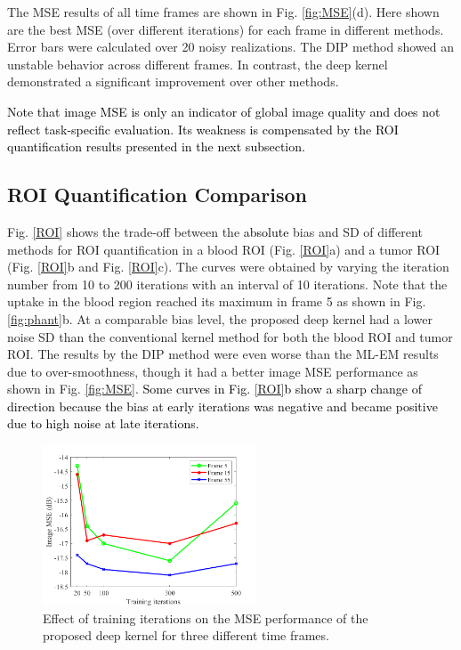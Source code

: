\documentclass[]{IEEETran}
\newcommand{\txtb}[1]{\textcolor{black}{#1}}
\begin{document}
	The MSE results of all time frames are shown in Fig. \ref{fig:MSE}(d). Here shown are the best MSE (over different iterations) for each frame in different methods. Error bars were calculated over 20 noisy realizations. %
	The DIP method showed an unstable behavior across different frames. In contrast, the deep kernel demonstrated a significant improvement over other methods.
	
	\txtb{Note that image MSE is only an indicator of global image quality and does not reflect task-specific evaluation. Its weakness is compensated by the ROI quantification results presented in the next subsection.}
	
	\subsection{ROI Quantification Comparison}
	Fig. \ref{ROI} shows the trade-off between the \txtb{absolute} bias and SD of different methods for ROI quantification in a blood ROI
	(Fig. \ref{ROI}a) and a tumor ROI (Fig. \ref{ROI}b and Fig. \ref{ROI}c). The curves were obtained by varying the iteration number from 10 to 200 iterations with an interval of 10 iterations. Note that the uptake in the blood region reached its maximum in frame 5 as shown in Fig. \ref{fig:phant}b. At a comparable bias level, the proposed deep kernel had a lower noise SD than the conventional kernel method for both the blood ROI and tumor ROI. The results by the DIP method were even worse than the ML-EM results due to over-smoothness, though it had a better image MSE performance as shown in Fig. \ref{fig:MSE}. \txtb{Some curves in Fig. \ref{ROI}b  show a sharp change of direction because the bias at early iterations was negative and became positive due to high noise at late iterations.} 
	
	\begin{figure}[t]
		\centering
		\includegraphics[trim=1cm 0cm 1cm 0cm, width=2.5in]{training_iterations.png}
		\caption{Effect of training iterations on the MSE performance of the proposed deep kernel for three different time frames.}
		\label{fig:training_iterations}	
	\end{figure}
	
\end{document}
